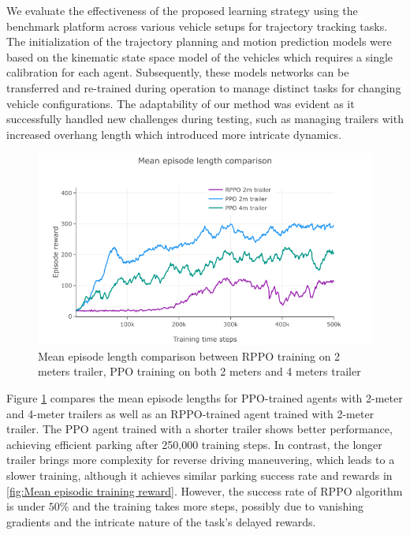 We evaluate the effectiveness of the proposed learning strategy using the benchmark platform across various vehicle setups for trajectory tracking tasks. The initialization of the trajectory planning and motion prediction models were based on the kinematic state space model of the vehicles which requires a single calibration for each agent. Subsequently, these models networks can be transferred and re-trained during operation to manage distinct tasks for changing vehicle configurations. The adaptability of our method was evident as it successfully handled new challenges during testing, such as managing trailers with increased overhang length which introduced more intricate dynamics.


\begin{figure}[htbp]
\centerline{\includegraphics[width=0.8\linewidth]{fig/knownMBRL/Mean episode length.png}}
\caption{Mean episode length comparison between RPPO training on 2 meters trailer, PPO training on both 2 meters and 4 meters trailer}
\label{fig:Mean episode length}
\end{figure}

Figure \ref{fig:Mean episode length} compares the mean episode lengths for PPO-trained agents with 2-meter and 4-meter trailers as well as an RPPO-trained agent trained with 2-meter trailer. The PPO agent trained with a shorter trailer shows better performance, achieving efficient parking after 250,000 training steps. In contrast, the longer trailer brings more complexity for reverse driving maneuvering, which leads to a slower training, although it achieves similar parking success rate and rewards in \ref{fig:Mean episodic training reward}. However, the success rate of RPPO algorithm is under $50\%$ and the training takes more steps, possibly due to vanishing gradients and the intricate nature of the task's delayed rewards.

